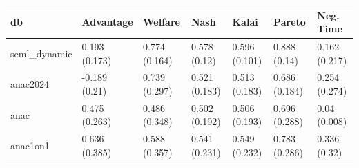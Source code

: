 \begin{tabular}{lllllll}
\toprule
db & Advantage & Welfare & Nash & Kalai & Pareto & Neg. Time \\
\midrule
scml_dynamic & 0.193 (0.173) & 0.774 (0.164) & 0.578 (0.12) & 0.596 (0.101) & 0.888 (0.14) & 0.162 (0.217) \\
anac2024 & -0.189 (0.21) & 0.739 (0.297) & 0.521 (0.183) & 0.513 (0.183) & 0.686 (0.184) & 0.254 (0.274) \\
anac & 0.475 (0.263) & 0.486 (0.348) & 0.502 (0.192) & 0.506 (0.193) & 0.696 (0.288) & 0.04 (0.008) \\
anac1on1 & 0.636 (0.385) & 0.588 (0.357) & 0.541 (0.231) & 0.549 (0.232) & 0.783 (0.286) & 0.336 (0.32) \\
\bottomrule
\end{tabular}
